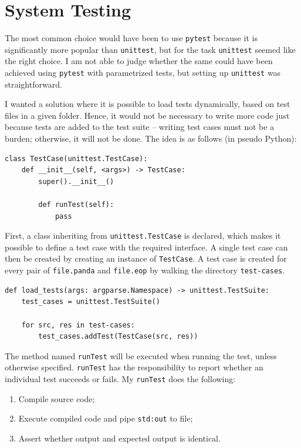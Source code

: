 \section{System Testing}
The most common choice would have been to use \texttt{pytest} because it is significantly more popular than \texttt{unittest}, but for the task \texttt{unittest} seemed like the right choice. I am not able to judge whether the same could have been achieved using \texttt{pytest} with parametrized tests, but setting up \texttt{unittest} was straightforward.

I wanted a solution where it is possible to load tests dynamically, based on test files in a given folder. Hence, it would not be necessary to write more code just because tests are added to the test suite -- writing test cases must not be a burden; otherwise, it will not be done. The idea is as follows (in pseudo Python):

\begin{verbatim}
class TestCase(unittest.TestCase):
    def __init__(self, <args>) -> TestCase:
        super().__init__()

        def runTest(self):
            pass
\end{verbatim}

First, a class inheriting from \texttt{unittest.TestCase} is declared, which makes it possible to define a test case with the required interface. A single test case can then be created by creating an instance of \texttt{TestCase}. A test case is created for every pair of \texttt{file.panda} and \texttt{file.eop} by walking the directory \texttt{test-cases}.

\begin{verbatim}
def load_tests(args: argparse.Namespace) -> unittest.TestSuite:
    test_cases = unittest.TestSuite()

    for src, res in test-cases:
        test_cases.addTest(TestCase(src, res))
\end{verbatim}

The method named \texttt{runTest} will be executed when running the test, unless otherwise specified. \texttt{runTest} has the responsibility to report whether an individual test succeeds or fails. My \texttt{runTest} does the following:

\begin{enumerate}
    \item Compile source code;
    \item Execute compiled code and pipe \texttt{std:out} to file;
    \item Assert whether output and expected output is identical.
\end{enumerate}

